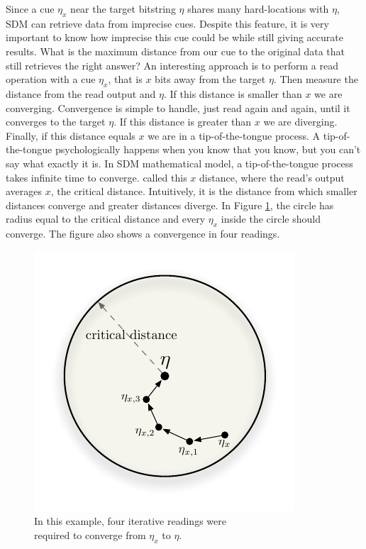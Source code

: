 Since a cue $\eta_{x}$ near the target bitstring $\eta$ shares many hard-locations with $\eta$, SDM can retrieve data from imprecise cues. Despite this feature, it is very important to know how imprecise this cue could be while still giving accurate results. What is the maximum distance from our cue to the original data that still retrieves the right answer? An interesting approach is to perform a read operation with a cue $\eta_{x}$, that is $x$ bits away from the target $\eta$.  Then measure the distance from the read output and $\eta$. If this distance is smaller than $x$ we are converging. Convergence is simple to handle, just read again and again, until it converges to the target $\eta$. If this distance is greater than $x$ we are diverging. Finally, if this distance equals $x$ we are in a tip-of-the-tongue process.  A tip-of-the-tongue psychologically happens when you know that you know, but you can't say what exactly it is. In SDM mathematical model, a tip-of-the-tongue process takes infinite time to converge. \citet{Kanerva1988} called this $x$ distance, where the read's output averages $x$, the critical distance. Intuitively, it is the distance from which smaller distances converge and greater distances diverge. In Figure \ref{fig-p1-p2-iterative-read}, the circle has radius equal to the critical distance and every $\eta_{x}$ inside the circle should converge.  The figure also shows a convergence in four readings.

\begin{figure}[!htb]
\centering\includegraphics[scale=0.75]{./images02/p1_p2_iter_read.pdf}

\caption{In this example, four iterative readings were\protect \\
required to converge from $\eta_{x}$ to $\eta$.\label{fig-p1-p2-iterative-read}}
\end{figure}


